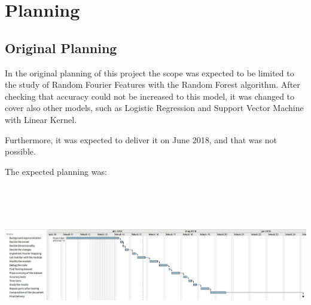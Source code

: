 \documentclass{article}
\begin{document}
%
%

\section{Planning}
    \subsection{Original Planning}

    In the original planning of this project the scope was
    expected to be limited to the study of Random Fourier Features with the
    Random Forest algorithm. After checking that accuracy could not be increased
    to this model, it was changed to cover also other models, such as Logistic
    Regression and Support Vector Machine with Linear Kernel.

    Furthermore, it was expected to deliver it on June 2018, and that was not
    possible.

    The expected planning was:

    \hspace*{-3cm}
    \includegraphics[width=17cm, height=7cm]{planning.jpg}
\end{document}
